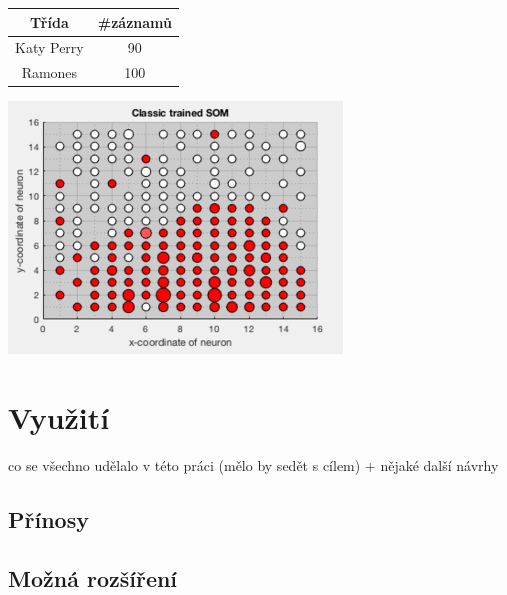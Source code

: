 \documentclass[thesis=M,czech]{FITthesis}[2012/06/26]
\begin{document}
  \begin{minipage}{\textwidth}
  
    \begin{minipage}[b]{0.39\textwidth}
    \centering
    \begin{tabular}{cc}\hline
      Třída & \#záznamů \\ \hline
        Katy Perry & 90 \\ \hline
        Ramones & 100 \\ \hline

      \end{tabular}
    \end{minipage}
    \hfill
  \begin{minipage}[b]{0.59\textwidth}
    \centering
    \includegraphics[scale=0.6]{trained_som_exampl}
  \end{minipage}

  \end{minipage}


\chapter{Využití}

\begin{conclusion}
	co se všechno udělalo v této práci (mělo by sedět s cílem)
	+ nějaké další návrhy
	
	\section{Přínosy}
	
	\section{Možná rozšíření}
\end{conclusion}
\end{document}
